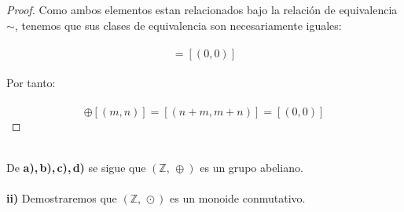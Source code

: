 \documentclass[11pt,letterpaper]{article}
\newcommand{\Z}{\mathbb{Z}}
\begin{document}
\begin{itemize}
\begin{proof}
        Como ambos elementos estan relacionados bajo la relaci\'on de equivalencia $\sim$, tenemos que sus clases de equivalencia
        son necesariamente iguales:\,\\
        \,\\
        \begin{equation*}
            [(n+m,m+n)]=[(0,0)]
        \end{equation*}\,\\
        Por tanto:\,\\
        \,\\
        \begin{equation*}
            [(n,m)]\oplus[(m,n)]=[(n+m,m+n)]=[(0,0)]
        \end{equation*}
    \end{proof}
    \end{itemize}\,\\
    De \textbf{a),\,b),\,c),\,d)} se sigue que $(\Z,\,\oplus)$ es un grupo abeliano.\,\\
    \,\\
    \textbf{ii)}\,\,Demostraremos que $(\Z,\,\odot)$ es un monoide conmutativo.\,\\
\end{document}
